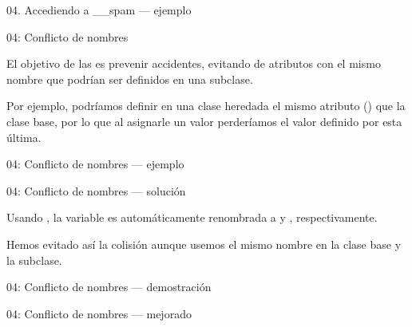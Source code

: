 \begin{frame}{04. Accediendo a \_\_spam — ejemplo}
  \small
\end{frame}

\begin{frame}{04: Conflicto de nombres}
  \begin{block}{}
    \centering
    El objetivo de las  es prevenir
    accidentes, evitando  de atributos con el
    mismo nombre que podrían ser definidos en una subclase.
  \end{block}

  \begin{center}
    \small
    Por ejemplo, podríamos definir en una clase heredada el mismo
    atributo () que la clase base, por lo que al
    asignarle un valor perderíamos el valor definido por esta última.
  \end{center}
\end{frame}

\begin{frame}{04: Conflicto de nombres — ejemplo}
  \small
\end{frame}

\begin{frame}{04: Conflicto de nombres — solución}
  \begin{block}{}
    \centering
     Usando , la variable es automáticamente
     renombrada a  y
     , respectivamente.
  \end{block}

  \begin{center}
    \small
    Hemos evitado así la colisión aunque usemos el mismo nombre en la
    clase base y la subclase.
  \end{center}
\end{frame}

\begin{frame}{04: Conflicto de nombres — demostración}
  \small
\end{frame}

\begin{frame}{04: Conflicto de nombres — mejorado}
  \scriptsize
\end{frame}

